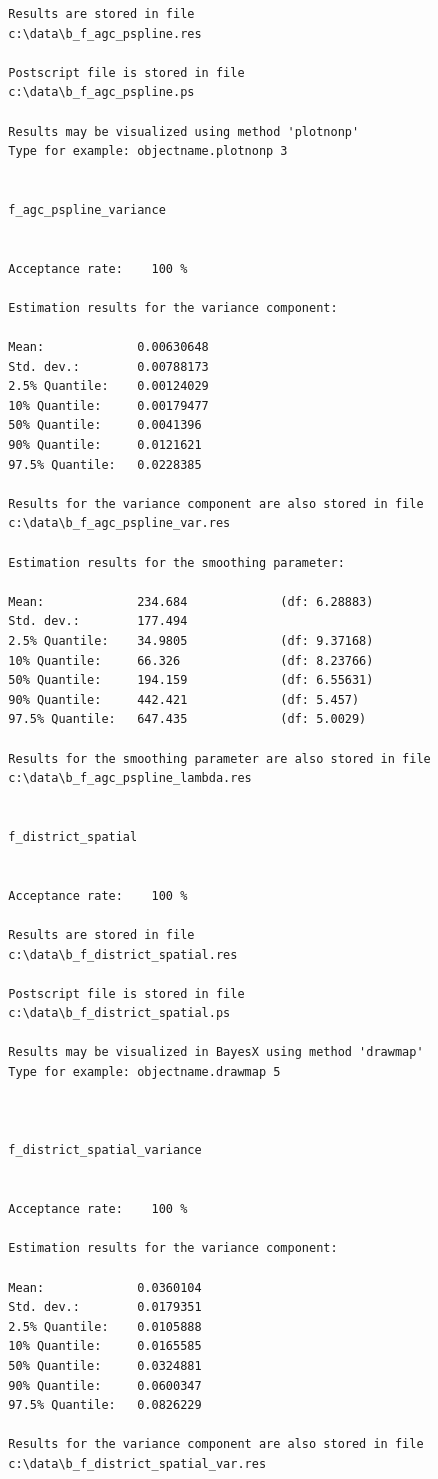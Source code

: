 \begin{verbatim}
  Results are stored in file
  c:\data\b_f_agc_pspline.res

  Postscript file is stored in file
  c:\data\b_f_agc_pspline.ps

  Results may be visualized using method 'plotnonp'
  Type for example: objectname.plotnonp 3


  f_agc_pspline_variance


  Acceptance rate:    100 %

  Estimation results for the variance component:

  Mean:             0.00630648
  Std. dev.:        0.00788173
  2.5% Quantile:    0.00124029
  10% Quantile:     0.00179477
  50% Quantile:     0.0041396
  90% Quantile:     0.0121621
  97.5% Quantile:   0.0228385

  Results for the variance component are also stored in file
  c:\data\b_f_agc_pspline_var.res

  Estimation results for the smoothing parameter:

  Mean:             234.684             (df: 6.28883)
  Std. dev.:        177.494
  2.5% Quantile:    34.9805             (df: 9.37168)
  10% Quantile:     66.326              (df: 8.23766)
  50% Quantile:     194.159             (df: 6.55631)
  90% Quantile:     442.421             (df: 5.457)
  97.5% Quantile:   647.435             (df: 5.0029)

  Results for the smoothing parameter are also stored in file
  c:\data\b_f_agc_pspline_lambda.res


  f_district_spatial


  Acceptance rate:    100 %

  Results are stored in file
  c:\data\b_f_district_spatial.res

  Postscript file is stored in file
  c:\data\b_f_district_spatial.ps

  Results may be visualized in BayesX using method 'drawmap'
  Type for example: objectname.drawmap 5



  f_district_spatial_variance


  Acceptance rate:    100 %

  Estimation results for the variance component:

  Mean:             0.0360104
  Std. dev.:        0.0179351
  2.5% Quantile:    0.0105888
  10% Quantile:     0.0165585
  50% Quantile:     0.0324881
  90% Quantile:     0.0600347
  97.5% Quantile:   0.0826229

  Results for the variance component are also stored in file
  c:\data\b_f_district_spatial_var.res


\end{verbatim}
